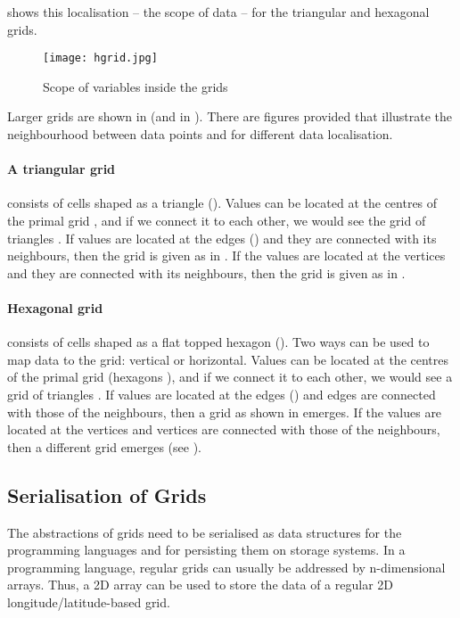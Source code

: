  shows this localisation -- the scope of data -- for the triangular and hexagonal grids.

\begin{figure}[tb]
  \centering
  \texttt{[image: hgrid.jpg]}
  \caption{Scope of variables inside the grids}
  \label{fig:grid}
\end{figure}

Larger grids are shown in  (and in ).
There are figures provided that illustrate the neighbourhood between data points and for different data localisation.

\paragraph{A triangular grid} consists of cells shaped as a triangle ().
Values can be located at the centres of the primal grid , and if we connect it to each other, we would see the grid of triangles .
If values are located at the edges () and they are connected with its neighbours, then the grid is given as in .
If the values are located at the vertices and they are connected with its neighbours, then the grid is given as in .

\paragraph{Hexagonal grid} consists of cells shaped as a flat topped hexagon ().
Two ways can be used to map data to the grid: vertical or horizontal.
Values can be located at the centres of the primal grid (hexagons ), and if we connect it to each other, we would see a grid of triangles .
If values are located at the edges () and edges are connected with those of the neighbours, then a grid as shown in  emerges.
If the values are located at the vertices and vertices are connected with those of the neighbours, then a different grid emerges (see ).


\subsection{Serialisation of Grids}
The abstractions of grids need to be serialised as data structures for the programming languages and for persisting them on storage systems.
In a programming language, regular grids can usually be addressed by n-dimensional arrays.
Thus, a 2D array can be used to store the data of a regular 2D longitude/latitude-based grid.

